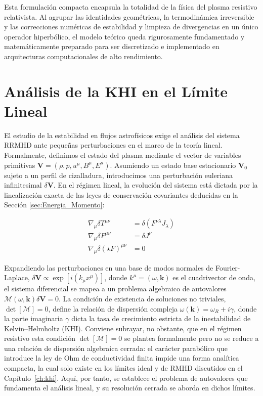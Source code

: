 Esta formulación compacta encapsula la totalidad de la física del plasma resistivo relativista. Al agrupar las identidades geométricas, la termodinámica irreversible y las correcciones numéricas de estabilidad y limpieza de divergencias en un único operador hiperbólico, el modelo teórico queda rigurosamente fundamentado y matemáticamente preparado para ser discretizado e implementado en arquitecturas computacionales de alto rendimiento.

\section{Análisis de la KHI en el Límite Lineal}

\primerparrafo El estudio de la estabilidad en flujos astrofísicos exige el análisis del sistema RRMHD ante pequeñas perturbaciones en el marco de la teoría lineal. Formalmente, definimos el estado del plasma mediante el vector de variables primitivas $\mathbf{V} = (\rho, p, u^\mu, B^\mu, E^\mu)$. Asumiendo un estado base estacionario $\mathbf{V}_0$ sujeto a un perfil de cizalladura, introducimos una perturbación euleriana infinitesimal $\delta \mathbf{V}$. En el régimen lineal, la evolución del sistema está dictada por la linealización exacta de las leyes de conservación covariantes deducidas en la Sección \ref{sec:Energia_Momento}:

\begin{align}
    \nabla_\mu \delta T^{\mu\nu} &= \delta (F^{\nu\lambda} J_\lambda) \\
    \nabla_\mu \delta F^{\mu\nu} &= \delta J^\nu \\
    \nabla_\mu \delta (\star F)^{\mu\nu} &= 0
\end{align}

Expandiendo las perturbaciones en una base de modos normales de Fourier-Laplace, $\delta \mathbf{V} \propto \exp[i(k_\mu x^\mu)]$, donde $k^\mu = (\omega, \mathbf{k})$ es el cuadrivector de onda, el sistema diferencial se mapea a un problema algebraico de autovalores $\mathcal{M}(\omega, \mathbf{k}) \delta \mathbf{V} = 0$. La condición de existencia de soluciones no triviales, $\det[\mathcal{M}] = 0$, define la relación de dispersión compleja $\omega(\mathbf{k}) = \omega_R + i\gamma$, donde la parte imaginaria $\gamma$ dicta la tasa de crecimiento estricta de la inestabilidad de Kelvin--Helmholtz (KHI). Conviene subrayar, no obstante, que en el régimen resistivo esta condición $\det[\mathcal{M}]=0$ se plantea formalmente pero no se reduce a una relación de dispersión algebraica cerrada: el carácter parabólico que introduce la ley de Ohm de conductividad finita impide una forma analítica compacta, la cual solo existe en los límites ideal y de RMHD discutidos en el Capítulo~\ref{ch:khi}. Aquí, por tanto, se establece el problema de autovalores que fundamenta el análisis lineal, y su resolución cerrada se aborda en dichos límites.
